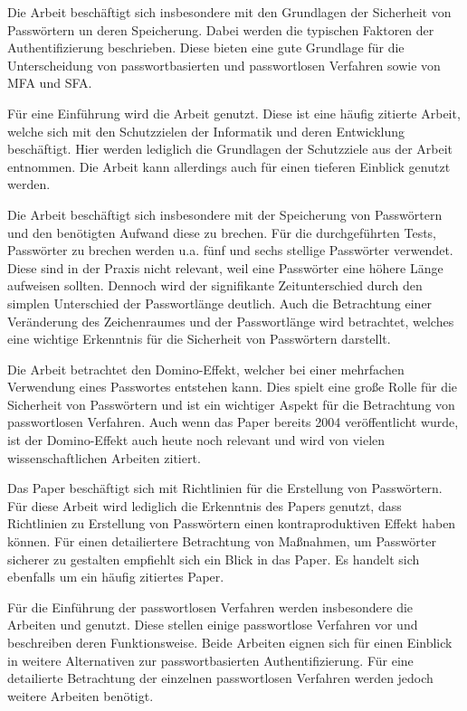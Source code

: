 Die Arbeit \cite{boonkrong2012security} beschäftigt sich insbesondere mit den Grundlagen der Sicherheit von Passwörtern un deren Speicherung. Dabei werden die typischen Faktoren der Authentifizierung beschrieben. Diese bieten eine gute Grundlage für die Unterscheidung von passwortbasierten und passwortlosen Verfahren sowie von \ac{MFA} und \ac{SFA}. 

Für eine Einführung wird die Arbeit \cite{samonas2014cia} genutzt. Diese ist eine häufig zitierte Arbeit, welche sich mit den Schutzzielen der Informatik und deren Entwicklung beschäftigt. Hier werden lediglich die Grundlagen der Schutzziele aus der Arbeit entnommen. Die Arbeit kann allerdings auch für einen tieferen Einblick genutzt werden.

Die Arbeit \cite{chanda2016password} beschäftigt sich insbesondere mit der Speicherung von Passwörtern und den benötigten Aufwand diese zu brechen. Für die durchgeführten Tests, Passwörter zu brechen werden u.a. fünf und sechs stellige Passwörter verwendet. Diese sind in der Praxis nicht relevant, weil eine Passwörter eine höhere Länge aufweisen sollten. Dennoch wird der signifikante Zeitunterschied durch den simplen Unterschied der Passwortlänge deutlich. Auch die Betrachtung einer Veränderung des Zeichenraumes und der Passwortlänge wird betrachtet, welches eine wichtige Erkenntnis für die Sicherheit von Passwörtern darstellt.

Die Arbeit \cite{ives2004domino} betrachtet den Domino-Effekt, welcher bei einer mehrfachen Verwendung eines Passwortes entstehen kann. Dies spielt eine große Rolle für die Sicherheit von Passwörtern und ist ein wichtiger Aspekt für die Betrachtung von passwortlosen Verfahren. Auch wenn das Paper bereits 2004 veröffentlicht wurde, ist der Domino-Effekt auch heute noch relevant und wird von vielen wissenschaftlichen Arbeiten zitiert.

Das Paper \cite{yildirim2019encouraging} beschäftigt sich mit Richtlinien für die Erstellung von Passwörtern. Für diese Arbeit wird lediglich die Erkenntnis des Papers genutzt, dass Richtlinien zu Erstellung von Passwörtern einen kontraproduktiven Effekt haben können. Für einen detailiertere Betrachtung von Maßnahmen, um Passwörter sicherer zu gestalten empfiehlt sich ein Blick in das Paper. Es handelt sich ebenfalls um ein häufig zitiertes Paper.

Für die Einführung der passwortlosen Verfahren werden insbesondere die Arbeiten \cite{chowhan2019password} und \cite{parmar2022comprehensive} genutzt. Diese stellen einige passwortlose Verfahren vor und beschreiben deren Funktionsweise. Beide Arbeiten eignen sich für einen Einblick in weitere Alternativen zur passwortbasierten Authentifizierung. Für eine detailierte Betrachtung der einzelnen passwortlosen Verfahren werden jedoch weitere Arbeiten benötigt.


